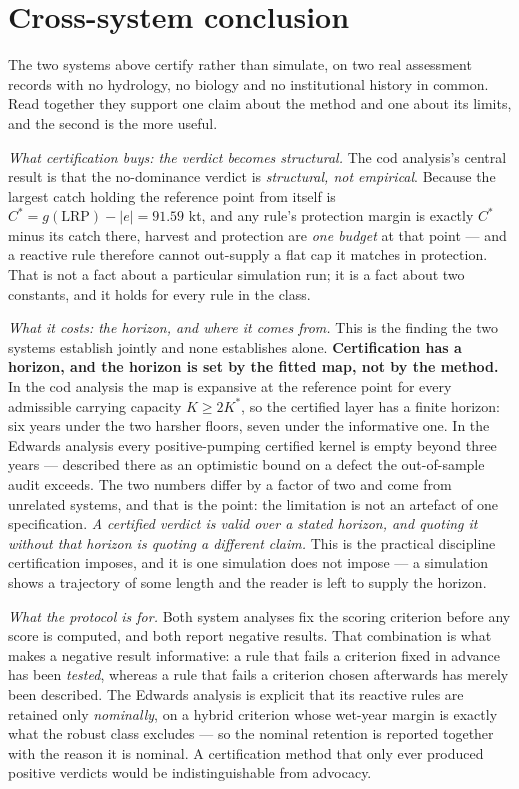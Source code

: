 \documentclass[11pt]{article}
\begin{document}
\section{Cross-system conclusion}
\label{conclusion}

The two systems above certify rather than simulate, on two real assessment records with no hydrology,
no biology and no institutional history in common. Read together they support one claim about the
method and one about its limits, and the second is the more useful.

\emph{What certification buys: the verdict becomes structural.} The cod analysis's central result is that the
no-dominance verdict is \emph{structural, not empirical}. Because the largest catch holding the
reference point from itself is $C^* = g(\mathrm{LRP}) - |e| = 91.59$ kt, and any rule's protection
margin is exactly $C^*$ minus its catch there, harvest and protection are \emph{one budget} at that
point --- and a reactive rule therefore cannot out-supply a flat cap it matches in protection. That
is not a fact about a particular simulation run; it is a fact about two constants, and it holds for
every rule in the class.

\emph{What it costs: the horizon, and where it comes from.} This is the finding the two systems
establish jointly and none establishes alone. \textbf{Certification has a horizon, and the horizon
is set by the fitted map, not by the method.} In the cod analysis the map is expansive at the reference point
for every admissible carrying capacity $K \ge 2K^*$, so the certified layer has a finite horizon:
six years under the two harsher floors, seven under the informative one. In the Edwards analysis every
positive-pumping certified kernel is empty beyond three years --- described there as an optimistic
bound on a defect the out-of-sample audit exceeds. The two numbers differ by a factor of two and
come from unrelated systems, and that is the point: the limitation is not an artefact of one
specification. \emph{A certified verdict is valid over a stated horizon, and quoting it without that
horizon is quoting a different claim.} This is the practical discipline certification imposes, and
it is one simulation does not impose --- a simulation shows a trajectory of some length and the
reader is left to supply the horizon.

\emph{What the protocol is for.} Both system analyses fix the scoring criterion before any score is
computed, and both report negative results. That combination is what makes a negative result
informative: a rule that fails a criterion fixed in advance has been \emph{tested}, whereas a rule
that fails a criterion chosen afterwards has merely been described. The Edwards analysis is explicit that its
reactive rules are retained only \emph{nominally}, on a hybrid criterion whose wet-year margin is
exactly what the robust class excludes --- so the nominal retention is reported together with the
reason it is nominal. A certification method that only ever produced
positive verdicts would be indistinguishable from advocacy.
\end{document}
